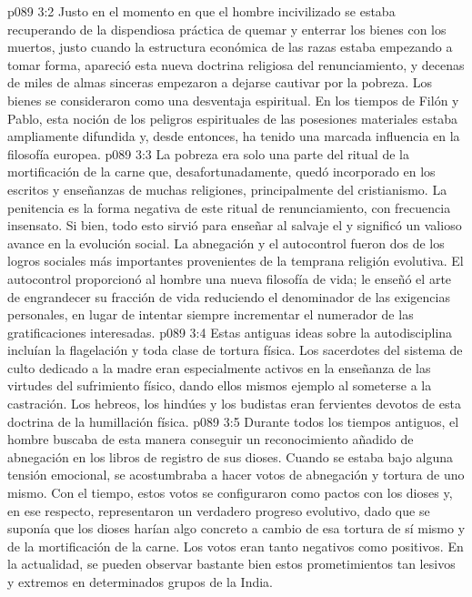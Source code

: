 \vs p089 3:2 Justo en el momento en que el hombre incivilizado se estaba recuperando de la dispendiosa práctica de quemar y enterrar los bienes con los muertos, justo cuando la estructura económica de las razas estaba empezando a tomar forma, apareció esta nueva doctrina religiosa del renunciamiento, y decenas de miles de almas sinceras empezaron a dejarse cautivar por la pobreza. Los bienes se consideraron como una desventaja espiritual. En los tiempos de Filón y Pablo, esta noción de los peligros espirituales de las posesiones materiales estaba ampliamente difundida y, desde entonces, ha tenido una marcada influencia en la filosofía europea.
\vs p089 3:3 La pobreza era solo una parte del ritual de la mortificación de la carne que, desafortunadamente, quedó incorporado en los escritos y enseñanzas de muchas religiones, principalmente del cristianismo. La penitencia es la forma negativa de este ritual de renunciamiento, con frecuencia insensato. Si bien, todo esto sirvió para enseñar al salvaje el  y significó un valioso avance en la evolución social. La abnegación y el autocontrol fueron dos de los logros sociales más importantes provenientes de la temprana religión evolutiva. El autocontrol proporcionó al hombre una nueva filosofía de vida; le enseñó el arte de engrandecer su fracción de vida reduciendo el denominador de las exigencias personales, en lugar de intentar siempre incrementar el numerador de las gratificaciones interesadas.
\vs p089 3:4 Estas antiguas ideas sobre la autodisciplina incluían la flagelación y toda clase de tortura física. Los sacerdotes del sistema de culto dedicado a la madre eran especialmente activos en la enseñanza de las virtudes del sufrimiento físico, dando ellos mismos ejemplo al someterse a la castración. Los hebreos, los hindúes y los budistas eran fervientes devotos de esta doctrina de la humillación física.
\vs p089 3:5 Durante todos los tiempos antiguos, el hombre buscaba de esta manera conseguir un reconocimiento añadido de abnegación en los libros de registro de sus dioses. Cuando se estaba bajo alguna tensión emocional, se acostumbraba a hacer votos de abnegación y tortura de uno mismo. Con el tiempo, estos votos se configuraron como pactos con los dioses y, en ese respecto, representaron un verdadero progreso evolutivo, dado que se suponía que los dioses harían algo concreto a cambio de esa tortura de sí mismo y de la mortificación de la carne. Los votos eran tanto negativos como positivos. En la actualidad, se pueden observar bastante bien estos prometimientos tan lesivos y extremos en determinados grupos de la India.
